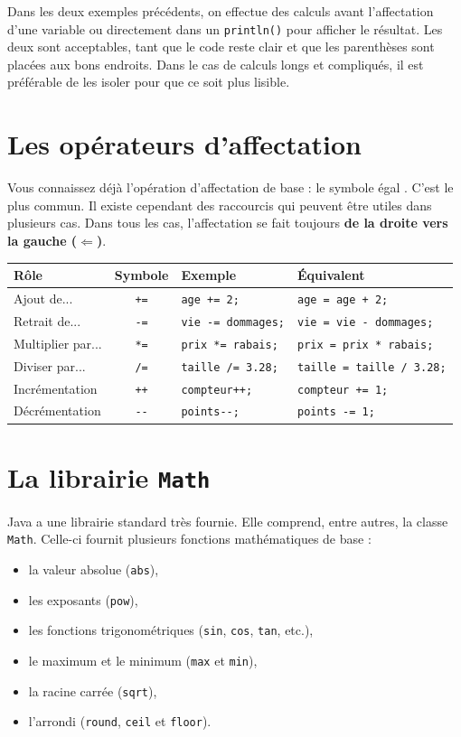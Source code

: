 \documentclass[12pt]{report}
\newcommand{\commande}[1]{%
\tcbox[on line, size=fbox, colframe=black, boxrule=0.75pt, tcbox raise base]{#1} %
}
\begin{document}
Dans les deux exemples précédents, on effectue des calculs avant l'affectation d'une variable ou directement dans un \texttt{println()} pour afficher le résultat. Les deux sont acceptables, tant que le code reste clair et que les parenthèses sont placées aux bons endroits. Dans le cas de calculs longs et compliqués, il est préférable de les isoler pour que ce soit plus lisible.

\section{Les opérateurs d'affectation}
Vous connaissez déjà l'opération d'affectation de base : le symbole égal \commande{=}. C'est le plus commun. Il existe cependant des raccourcis qui peuvent être utiles dans plusieurs cas. Dans tous les cas, l'affectation se fait toujours \textbf{de la droite vers la gauche ($\boldsymbol{\Leftarrow}$)}.

\begin{center}
\renewcommand{\arraystretch}{1.5}
	\begin{tabularx}{\linewidth}{l c X X} \toprule
		\textbf{Rôle} & \textbf{Symbole} & \textbf{Exemple} & \textbf{Équivalent} \\ \midrule
		Ajout de... & \texttt{+=} & \texttt{age += 2;} & \texttt{age = age + 2;} \\
		Retrait de... & \texttt{-=} & \texttt{vie -= dommages;} & \texttt{vie = vie - dommages;} \\
		Multiplier par... & \texttt{*=} & \texttt{prix *= rabais;} & \texttt{prix = prix * rabais;} \\
		Diviser par... & \texttt{/=} & \texttt{taille /= 3.28;} & \texttt{taille = taille / 3.28;} \\
		Incrémentation & \texttt{++} & \texttt{compteur++;} & \texttt{compteur += 1;} \\
		Décrémentation & \texttt{-{}-} & \texttt{points-{}-;} & \texttt{points -= 1;} \\ \bottomrule
	\end{tabularx}
\end{center}


\section{La librairie \texttt{Math}}
Java a une librairie standard très fournie. Elle comprend, entre autres, la classe \texttt{Math}. Celle-ci fournit plusieurs fonctions mathématiques de base : 
\begin{itemize}
	\item la valeur absolue (\texttt{abs}),
	\item les exposants (\texttt{pow}),
	\item les fonctions trigonométriques (\texttt{sin}, \texttt{cos}, \texttt{tan}, etc.),
	\item le maximum et le minimum (\texttt{max} et \texttt{min}),
	\item la racine carrée (\texttt{sqrt}),
	\item l'arrondi (\texttt{round}, \texttt{ceil} et \texttt{floor}).
\end{itemize}
\end{document}
